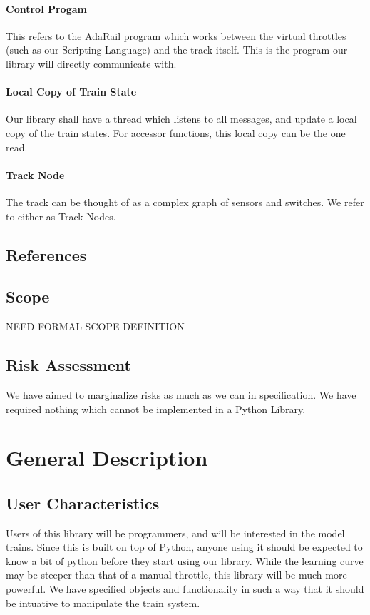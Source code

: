 \documentclass[a4paper,11pt,notitlepage]{article}
\def\CS{Control Progam\xspace} \def\LC{Local Copy of Train State\xspace} \def\TN{Track Node\xspace}
\begin{document}
\paragraph{\CS} This refers to the AdaRail program which works between the virtual throttles (such as our Scripting Language) and the track itself. This is the program our library will directly communicate with.
\paragraph{\LC} Our library shall have a thread which listens to all messages, and update a local copy of the train states. For accessor functions, this local copy can be the one read.
\paragraph{\TN} The track can be thought of as a complex graph of sensors and switches. We refer to either as \TN{}s.
\subsection{References}

\newpage
\subsection{Scope}
NEED FORMAL SCOPE DEFINITION
\subsection{Risk Assessment}
We have aimed to marginalize risks as much as we can in specification. We have required nothing which cannot be implemented in a Python Library.

\newpage
\section{General Description}
\subsection{User Characteristics}
Users of this library will be programmers, and will be interested in the model trains. Since this is built on top of Python, anyone using it should be expected to know a bit of python before they start using our library. While the learning curve may be steeper than that of a manual throttle, this library will be much more powerful. We have specified objects and functionality in such a way that it should be intuative to manipulate the train system.
\end{document}
